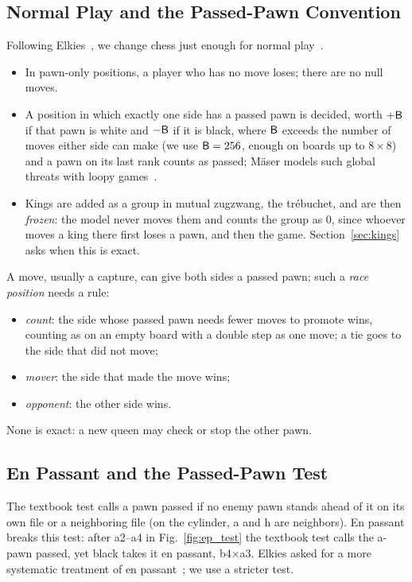 \subsection{Normal Play and the Passed-Pawn Convention}
Following Elkies~\cite{Elkies1996}, we change chess just enough for normal play~\cite{WinningWays}.
\begin{itemize}
\item In pawn-only positions, a player who has no move loses; there are no null moves.
\item A position in which exactly one side has a passed pawn is decided, worth $+\mathsf{B}$ if that pawn is white and
  $-\mathsf{B}$ if it is black, where $\mathsf{B}$ exceeds the number of moves either side can make (we use $\mathsf{B}=256$, enough on boards up to $8\times8$) and a pawn on its last rank counts as passed;
  M\"aser models such global threats with loopy games~\cite{Maeser2002}.
\item Kings are added as a group in mutual zugzwang, the tr\'ebuchet, and are then \emph{frozen}: the model
  never moves them and counts the group as $0$, since whoever moves a king there first loses a pawn, and then
  the game. Section~\ref{sec:kings} asks when this is exact.
\end{itemize}
A move, usually a capture, can give both sides a passed pawn; such a \emph{race position} needs a rule:
\begin{itemize}
\item \emph{count}: the side whose passed pawn needs fewer moves to promote wins, counting as on an empty
  board with a double step as one move; a tie goes to the side that did not move;
\item \emph{mover}: the side that made the move wins;
\item \emph{opponent}: the other side wins.
\end{itemize}
None is exact: a new queen may check or stop the other pawn.

\subsection{En Passant and the Passed-Pawn Test}\label{sec:ep}
The textbook test calls a pawn passed if no enemy pawn stands ahead of it on its own file or a neighboring file
(on the cylinder, a and h are neighbors). En passant breaks this test: after a2--a4 in Fig.~\ref{fig:ep_test}
the textbook test calls the a-pawn passed, yet black takes it en passant, b4$\times$a3. Elkies asked for a
more systematic treatment of en passant~\cite{Elkies1996}; we use a stricter test.

